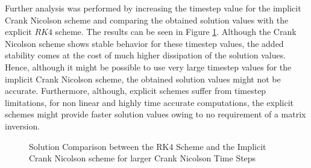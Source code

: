 \documentclass[12pt,dvipsnames]{article}
\newcommand{\an}[1]{{\leavevmode\color{BrickRed}{#1}}}
\begin{document}
Further analysis was performed by increasing the timestep value for the implicit Crank Nicolson scheme and comparing the obtained solution values with the explicit $RK4$ scheme. The results can be seen in Figure \ref{fig:CNTimestep}. Although the Crank Nicolson scheme shows stable behavior for these timestep values, the added stability comes at the cost of much higher dissipation of the solution values. Hence, although it might be possible to use very large timestep values for the implicit Crank Nicolson scheme, the obtained solution values might not be accurate. Furthermore, although, explicit schemes suffer from timestep limitations, for non linear and highly time accurate computations, the explicit schemes might provide faster solution values owing to no requirement of a matrix inversion.
\an{In this particular case the system defined by the Crank-Nicolson solver is tridiagonal, so inverting it is actually (asymptotically) just as inexpensive as computing a single vector dot product; so here if you optimize everything, it will still be the case that CN is much more efficient. (For example, your code computes a dense inverse for CN, which is technically not necessary, but is certainly the easiest thing to code.)}
\begin{figure}
\centering
    \qquad
    \caption{Solution Comparison between the RK4 Scheme and the Implicit Crank Nicolson scheme for larger Crank Nicolson Time Steps}%
    \label{fig:CNTimestep}%
\end{figure}
\end{document}
